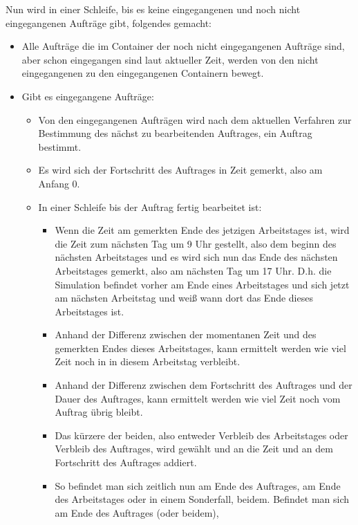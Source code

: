 \documentclass[a4paper,10pt,ngerman]{scrartcl}
\begin{document}
Nun wird in einer Schleife, bis es keine eingegangenen und noch nicht eingegangenen Aufträge gibt, folgendes gemacht:
\begin{itemize}
	\item Alle Aufträge die im Container der noch nicht eingegangenen Aufträge sind,
	      aber schon eingegangen sind laut aktueller Zeit, werden von den nicht eingegangenen zu den eingegangenen Containern bewegt.
	\item Gibt es eingegangene Aufträge:
	      \begin{itemize}
		      \item Von den eingegangenen Aufträgen wird nach dem aktuellen Verfahren
		            zur Bestimmung des nächst zu bearbeitenden Auftrages, ein Auftrag bestimmt.
		      \item Es wird sich der Fortschritt des Auftrages in Zeit gemerkt, also am Anfang 0.
		      \item In einer Schleife bis der Auftrag fertig bearbeitet ist:
		            \begin{itemize}
			            \item Wenn die Zeit am gemerkten Ende des jetzigen Arbeitstages ist, wird die Zeit zum nächsten Tag um 9 Uhr gestellt,
			                  also dem beginn des nächsten Arbeitstages und
			                  es wird sich nun das Ende des nächsten Arbeitstages gemerkt, also am nächsten Tag um 17 Uhr.
			                  D.h. die Simulation befindet vorher am Ende eines Arbeitstages und sich jetzt am nächsten Arbeitstag
			                  und weiß wann dort das Ende dieses Arbeitstages ist.
			            \item Anhand der Differenz zwischen der momentanen Zeit und des gemerkten Endes dieses Arbeitstages,
			                  kann ermittelt werden wie viel Zeit noch in in diesem Arbeitstag verbleibt.
			            \item Anhand der Differenz zwischen dem Fortschritt des Auftrages
			                  und der Dauer des Auftrages, kann ermittelt werden wie viel Zeit noch vom Auftrag übrig bleibt.
			            \item Das kürzere der beiden, also entweder Verbleib des Arbeitstages oder Verbleib des Auftrages,
			                  wird gewählt und an die Zeit und an dem Fortschritt des Auftrages addiert.
			            \item So befindet man sich zeitlich nun am Ende des Auftrages, am Ende des Arbeitstages
			                  oder in einem Sonderfall, beidem. Befindet man sich am Ende des Auftrages (oder beidem),

\end{itemize}
\end{itemize}
\end{itemize}
\end{document}
